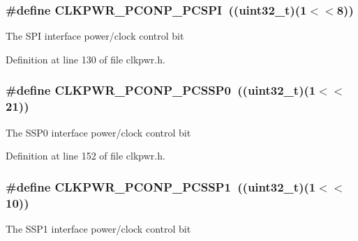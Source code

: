 \subsubsection[{\texorpdfstring{C\+L\+K\+P\+W\+R\+\_\+\+P\+C\+O\+N\+P\+\_\+\+P\+C\+S\+PI}{CLKPWR_PCONP_PCSPI}}]{\setlength{\rightskip}{0pt plus 5cm}\#define C\+L\+K\+P\+W\+R\+\_\+\+P\+C\+O\+N\+P\+\_\+\+P\+C\+S\+PI~(({\bf uint32\+\_\+t})(1$<$$<$8))}\hypertarget{group___c_l_k_p_w_r___public___macros_gae299e815a1e4239a3e6bb5ca4a24b14f}{}\label{group___c_l_k_p_w_r___public___macros_gae299e815a1e4239a3e6bb5ca4a24b14f}
The S\+PI interface power/clock control bit 

Definition at line 130 of file clkpwr.\+h.

\subsubsection[{\texorpdfstring{C\+L\+K\+P\+W\+R\+\_\+\+P\+C\+O\+N\+P\+\_\+\+P\+C\+S\+S\+P0}{CLKPWR_PCONP_PCSSP0}}]{\setlength{\rightskip}{0pt plus 5cm}\#define C\+L\+K\+P\+W\+R\+\_\+\+P\+C\+O\+N\+P\+\_\+\+P\+C\+S\+S\+P0~(({\bf uint32\+\_\+t})(1$<$$<$21))}\hypertarget{group___c_l_k_p_w_r___public___macros_ga4e542d17bed4b5833d41985770a6b44b}{}\label{group___c_l_k_p_w_r___public___macros_ga4e542d17bed4b5833d41985770a6b44b}
The S\+S\+P0 interface power/clock control bit 

Definition at line 152 of file clkpwr.\+h.

\subsubsection[{\texorpdfstring{C\+L\+K\+P\+W\+R\+\_\+\+P\+C\+O\+N\+P\+\_\+\+P\+C\+S\+S\+P1}{CLKPWR_PCONP_PCSSP1}}]{\setlength{\rightskip}{0pt plus 5cm}\#define C\+L\+K\+P\+W\+R\+\_\+\+P\+C\+O\+N\+P\+\_\+\+P\+C\+S\+S\+P1~(({\bf uint32\+\_\+t})(1$<$$<$10))}\hypertarget{group___c_l_k_p_w_r___public___macros_ga77f74b342abfbb8ede495727a588ee1b}{}\label{group___c_l_k_p_w_r___public___macros_ga77f74b342abfbb8ede495727a588ee1b}
The S\+S\+P1 interface power/clock control bit 


